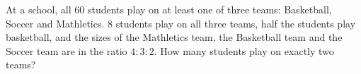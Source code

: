 At a school, all $60$ students play on at least one of three teams: Basketball, Soccer and Mathletics. $8$ students play on all three teams, half the students play basketball, and the sizes of the Mathletics team, the Basketball team and the Soccer team are in the ratio $4:3:2$. How many students play on exactly two teams?
